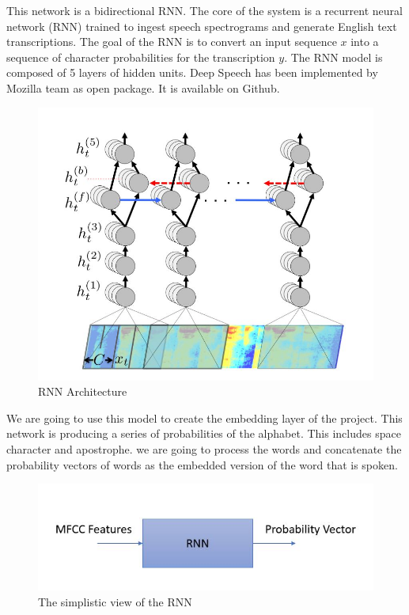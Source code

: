 This network is a bidirectional RNN. The core of the system is a recurrent neural network (RNN) trained to ingest speech spectrograms and generate English text transcriptions. The goal of the  RNN is to convert an input sequence $x$ into a sequence of character probabilities for the transcription $y$. The RNN model is composed of 5 layers of hidden units.  Deep Speech has been  implemented by Mozilla team as open package. It is available on Github.   

\begin{figure}[hbt!]
    \centering
    \includegraphics{Images/rnn.jpg}    
    \caption{RNN Architecture}
    \label{rnn_arch}
\end{figure}


We are going to use this model to create the embedding layer of the project.  This network is producing a series of probabilities of the alphabet. This includes space character and apostrophe. we are going to process the words and concatenate the probability vectors of words as the  embedded version of the word that is spoken. 

\begin{figure}[hbt!]
    \centering
    \includegraphics{Images/simple_model.jpg}    
    \caption{The simplistic view of the RNN}
    \label{simple_view}
\end{figure}

